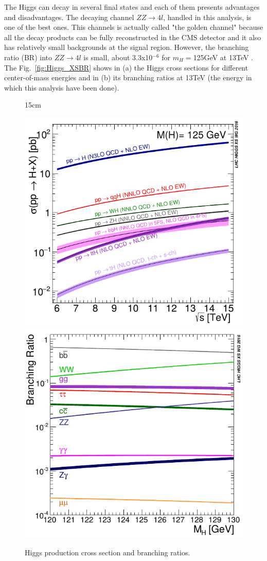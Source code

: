 The Higgs can decay in several final states and each of them presents advantages and disadvantages. The decaying channel $ZZ \rightarrow 4l$, handled in this analysis, is one of the best ones. This channels is actually called "the golden channel" because all the decay products can be fully reconstructed in the CMS detector and it also has relatively small backgrounds at the signal region. However, the branching ratio (BR) into $ZZ \rightarrow 4l$ is small, about 3.3x10$^{-6}$ for $m_{H} = $125GeV at 13TeV \cite{bib:LHC-Higgs-XSWG-2018}. The Fig.~\ref{fig:Higgs_XSBR} shows in (a) the Higgs cross sections for different center-of-mass energies and in (b) its branching ratios at 13TeV (the energy in which this analysis have been done).

\begin{figure}[htbp]{15cm}
	\caption{Higgs production cross section and branching ratios.}
	\includegraphics[scale=0.4]{ChapterTheory/figs/Higgs_XS_vs_S.png}
	\quad
	\includegraphics[scale=0.4]{ChapterTheory/figs/Higgs_BRs.png}

\end{figure}
